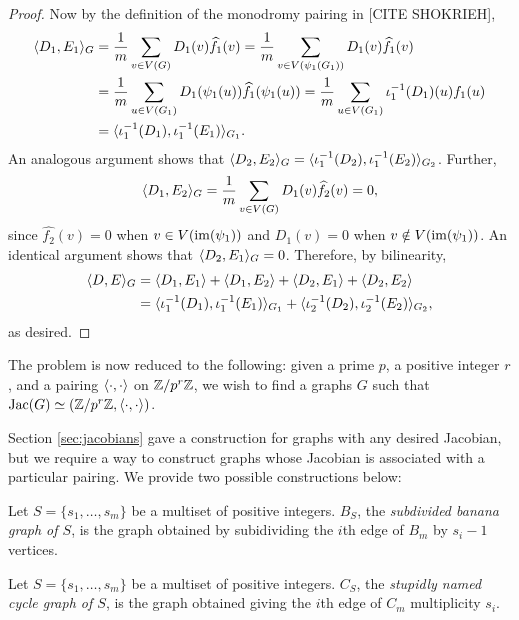 \documentclass{amsart}
\begin{document}
\begin{proof}
  Now by the definition of the monodromy pairing in [CITE SHOKRIEH],
  \begin{align*}
    \langle D_1, E_1 \rangle_G &= \frac{1}{m} \sum_{v \in V(G)} D_1(v) \widehat{f_1}(v) = \frac{1}{m} \sum_{v \in V(\psi_1(G_1))} D_1(v) \widehat{f_1}(v) \\
    &= \frac{1}{m} \sum_{u \in V(G_1)} D_1(\psi_1(u)) \widehat{f_1}(\psi_1(u)) = \frac{1}{m} \sum_{u\in V(G_1)} \iota_1^{-1}(D_1)(u)f_1(u) \\
    &= \langle \iota_1^{-1}(D_1), \iota_1^{-1}(E_1) \rangle_{G_1}.
  \end{align*}
  An analogous argument shows that $\langle D_2, E_2 \rangle_G =
  \langle \iota_1^{-1}(D_2), \iota_1^{-1}(E_2) \rangle_{G_2}$. Further,
  \[
  \langle D_1, E_2 \rangle_G = \frac{1}{m} \sum_{v \in V(G)} D_1(v)
  \widehat{f_2}(v) = 0,
  \]
  since $\widehat{f_2}(v)=0$ when $v\in V(\operatorname{im}(\psi_1))$ and $D_1(v)=0$
  when $v\notin V(\operatorname{im}(\psi_1))$. An identical argument shows that
  $\langle D_2, E_1 \rangle_G = 0$. Therefore, by bilinearity,
  \begin{align*}
    \langle D, E \rangle_G &= \langle D_1, E_1 \rangle + \langle D_1, E_2 \rangle + \langle D_2, E_1 \rangle + \langle D_2, E_2 \rangle \\
    &= \langle \iota_1^{-1}(D_1), \iota_1^{-1}(E_1) \rangle_{G_1} + \langle \iota_2^{-1}(D_2), \iota_2^{-1}(E_2) \rangle_{G_2},
  \end{align*}
  as desired.
\end{proof}

The problem is now reduced to the following: given a prime $p$, a
positive integer $r$, and a pairing $\langle \cdot, \cdot \rangle$ on
$\mathbb{Z}/p^r\mathbb{Z}$, we wish to find a graphs $G$ such that $\operatorname{Jac}(G) \simeq
(\mathbb{Z}/p^r\mathbb{Z}, \langle \cdot, \cdot \rangle)$.

Section \ref{sec:jacobians} gave a construction for graphs with any
desired Jacobian, but we require a way to construct graphs whose
Jacobian is associated with a particular pairing. We provide two
possible constructions below:

\begin{defn}
  Let $S = \{s_1, \ldots, s_m\}$ be a multiset of positive
  integers. $B_S$, the \emph{subdivided banana graph of $S$}, is the
  graph obtained by subidividing the $i$th edge of $B_m$ by $s_i-1$
  vertices.
\end{defn}

\begin{defn}
  Let $S = \{s_1, \ldots, s_m\}$ be a multiset of positive
  integers. $C_S$, the \emph{stupidly named cycle graph of $S$}, is
  the graph obtained giving the $i$th edge of $C_m$ multiplicity
  $s_i$.
\end{defn}
\end{document}
